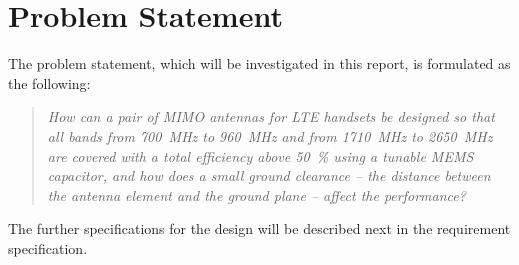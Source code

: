 \section{Problem Statement}
\label{sec:problem_statement}
The problem statement, which will be investigated in this report, is formulated as the following:
\begin{quote}
    \itshape
    How can a pair of MIMO antennas for LTE handsets be designed so that all bands from \SI{700}{MHz} to \SI{960}{MHz} and from \SI{1710}{MHz} to \SI{2650}{MHz} are covered with a total efficiency above \SI{50}{\%} using a tunable MEMS capacitor, and how does a small ground clearance -- the distance between the antenna element and the ground plane -- affect the performance?
\end{quote}
The further specifications for the design will be described next in the requirement specification.
